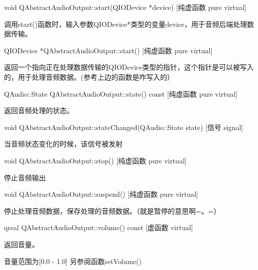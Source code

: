 void QAbstractAudioOutput::start(QIODevice *device) [纯虚函数 pure virtual] 

调用start()函数时，输入参数QIODevice*类型的变量device，用于音频后端处理数据传输。

QIODevice *QAbstractAudioOutput::start() [纯虚函数 pure virtual] 

返回一个指向正在处理数据传输的QIODevice类型的指针，这个指针是可以被写入的，用于处理音频数据。(参考上边的函数是咋写入的）

QAudio::State QAbstractAudioOutput::state() const [纯虚函数 pure
virtual] 

返回音频处理的状态。

void QAbstractAudioOutput::stateChanged(QAudio::State state) [信号
signal] 

当音频状态变化的时候，该信号被发射

void QAbstractAudioOutput::stop() [纯虚函数 pure virtual] 

停止音频输出

void QAbstractAudioOutput::suspend() [纯虚函数 pure virtual] 

停止处理音频数据，保存处理的音频数据。（就是暂停的意思啊=。=）

qreal QAbstractAudioOutput::volume() const [虚函数 virtual] 

返回音量。

音量范围为[0.0 - 1.0] 另参阅函数setVolume()

